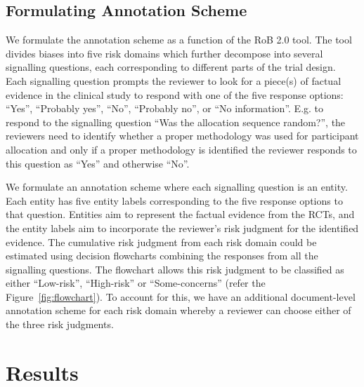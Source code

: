 \documentclass{IOS-Book-Article}
\begin{document}
\subsection{Formulating Annotation Scheme}
%
We formulate the annotation scheme as a function of the RoB 2.0 tool.
The tool divides biases into five risk domains which further decompose into several signalling questions, each corresponding to different parts of the trial design.
Each signalling question prompts the reviewer to look for a piece(s) of factual evidence in the clinical study to respond with one of the five response options: ``Yes'', ``Probably yes'', ``No'', ``Probably no'', or ``No information''.
E.g. to respond to the signalling question ``Was the allocation sequence random?'', the reviewers need to identify whether a proper methodology was used for participant allocation and only if a proper methodology is identified the reviewer responds to this question as ``Yes'' and otherwise ``No''.

We formulate an annotation scheme where each signalling question is an entity.
Each entity has five entity labels corresponding to the five response options to that question.
Entities aim to represent the factual evidence from the RCTs, and the entity labels aim to incorporate the reviewer's risk judgment for the identified evidence.
The cumulative risk judgment from each risk domain could be estimated using decision flowcharts combining the responses from all the signalling questions.
The flowchart allows this risk judgment to be classified as either ``Low-risk'', ``High-risk'' or ``Some-concerns'' (refer the Figure~\ref{fig:flowchart}).
To account for this, we have an additional document-level annotation scheme for each risk domain whereby a reviewer can choose either of the three risk judgments.
%
%
%
\section{Results}
\label{sec:results}
%
\end{document}
